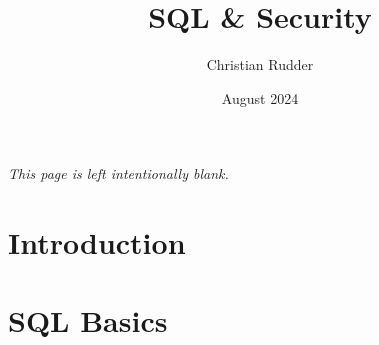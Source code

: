 \documentclass{article}
\title{SQL \& Security}
\author{Christian Rudder}
\date{August 2024}
\begin{document}
\maketitle

\tableofcontents

\newpage
\thispagestyle{empty}
\mbox{}
\vfill
\begin{center}
    \textit{This page is left intentionally blank.}
\end{center}
\vfill
\newpage

\section{Introduction}

\newpage

\section{SQL Basics}



\end{document}
